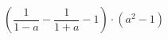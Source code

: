 \begin{ex}[type=expression]
	\begin{condition}
		\(\left( \dfrac{1}{1-a}-\dfrac{1}{1+a} -1\right)\cdot(a^2-1)\)
	\end{condition}
\end{ex}